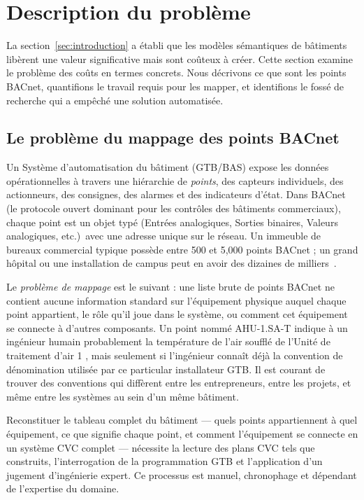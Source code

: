 \section{Description du problème}
\label{sec:problem}

La section~\ref{sec:introduction} a établi que les modèles sémantiques de bâtiments libèrent une valeur significative
mais sont coûteux à créer.
Cette section examine le problème des coûts en termes concrets.
Nous décrivons ce que sont les points BACnet, quantifions le travail requis pour les mapper, et identifions le fossé de recherche qui a empêché une solution automatisée.

\subsection{Le problème du mappage des points BACnet}
\label{subsec:bacnet-problem}

Un Système d'automatisation du bâtiment (GTB/BAS) expose les données opérationnelles à travers une hiérarchie de \emph{points},
des capteurs individuels, des actionneurs, des consignes, des alarmes et des indicateurs d'état.
Dans BACnet (le protocole ouvert dominant pour les contrôles des bâtiments commerciaux), chaque point est un objet typé
(Entrées analogiques, Sorties binaires, Valeurs analogiques, etc.)\ avec une adresse unique sur le réseau.
Un immeuble de bureaux commercial typique possède entre 500 et 5{,}000 points BACnet ; un grand hôpital ou
une installation de campus peut en avoir des dizaines de milliers~\cite{Trenbath2022}.

Le \emph{problème de mappage} est le suivant : une liste brute de points BACnet ne contient aucune information standard sur
l'équipement physique auquel chaque point appartient, le rôle qu'il joue dans le système, ou comment cet équipement
se connecte à d'autres composants.
Un point nommé AHU-1.SA-T indique à un ingénieur humain \og probablement la température de l'air soufflé de
l'Unité de traitement d'air 1 \fg{}, mais seulement si l'ingénieur connaît déjà la convention de dénomination utilisée par ce
particular installateur GTB.
Il est courant de trouver des conventions qui diffèrent entre les entrepreneurs, entre les projets, et même entre
les systèmes au sein d'un même bâtiment.

Reconstituer le tableau complet du bâtiment --- quels points appartiennent à quel équipement, ce que signifie chaque
point, et comment l'équipement se connecte en un système CVC complet --- nécessite la lecture des plans CVC tels que
construits, l'interrogation de la programmation GTB et l'application d'un jugement d'ingénierie expert.
Ce processus est manuel, chronophage et dépendant de l'expertise du domaine.

